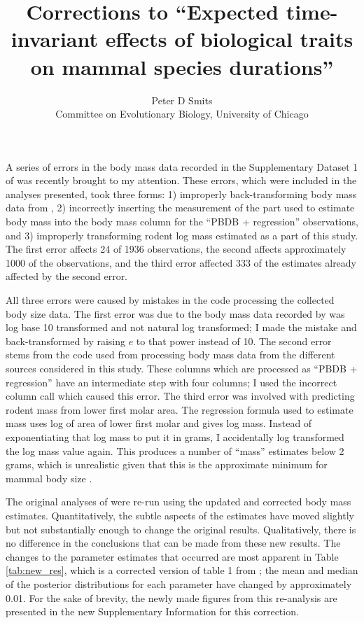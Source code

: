 \documentclass{article}
\title{Corrections to ``Expected time-invariant effects of biological traits on mammal species durations''}
\author{Peter D Smits\\Committee on Evolutionary Biology, University of Chicago}
\begin{document}
\maketitle

A series of errors in the body mass data recorded in the Supplementary Dataset 1 of \citep{Smits2015} was recently brought to my attention. These errors, which were included in the analyses presented, took three forms: 1) improperly back-transforming body mass data from \citet{Smith2004}, 2) incorrectly inserting the measurement of the part used to estimate body mass into the body mass column for the ``PBDB + regression'' observations, and 3) improperly transforming rodent log mass estimated as a part of this study. The first error affects 24 of 1936 observations, the second affects approximately 1000 of the observations, and the third error affected 333 of the estimates already affected by the second error.

All three errors were caused by mistakes in the code processing the collected body size data. The first error was due to the body mass data recorded by \citet{Smith2004} was log base 10 transformed and not natural log transformed; I made the mistake and back-transformed by raising \(e\) to that power instead of 10. The second error stems from the code used from processing body mass data from the different sources considered in this study. These columns which are processed as ``PBDB + regression'' have an intermediate step with four columns; I used the incorrect column call which caused this error. The third error was involved with predicting rodent mass from lower first molar area. The regression formula used to estimate mass uses log of area of lower first molar and gives log mass. Instead of exponentiating that log mass to put it in grams, I accidentally log transformed the log mass value again. This produces a number of ``mass'' estimates below 2 grams, which is unrealistic given that this is the approximate minimum for mammal body size \citep{Smith2004,Smith2011f}. 

The original analyses of \citep{Smits2015} were re-run using the updated and corrected body mass estimates. Quantitatively, the subtle aspects of the estimates have moved slightly but not substantially enough to change the original results. Qualitatively, there is no difference in the conclusions that can be made from these new results. The changes to the parameter estimates that occurred are most apparent in Table \ref{tab:new_res}, which is a corrected version of table 1 from \citet{Smits2015}; the mean and median of the posterior distributions for each parameter have changed by approximately 0.01. For the sake of brevity, the newly made figures from this re-analysis are presented in the new Supplementary Information for this correction.
\end{document}
